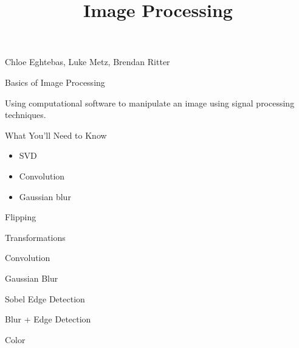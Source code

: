 \documentclass{beamer}
\begin{document}
\begin{frame}{}

\title{\textbf{Image Processing}}
\maketitle

Chloe Eghtebas, Luke Metz, Brendan Ritter


 
\end{frame}


\begin{frame}{Basics of Image Processing}


Using computational software to manipulate an image using signal processing techniques.

\end{frame}


\begin{frame}{What You'll Need to Know}

\begin{itemize}
	\item SVD
	\item Convolution
	\item Gaussian blur
\end{itemize}
\end{frame}

\begin{frame}{Flipping}

\end{frame}

\begin{frame}{Transformations}

\end{frame}

\begin{frame}{Convolution}
\end{frame}

\begin{frame}{Gaussian Blur}

\end{frame}

\begin{frame}{Sobel Edge Detection}

\end {frame}

\begin{frame}{Blur + Edge Detection}

\end{frame}


\begin{frame}{Color}

\end{frame}
\end{document}
